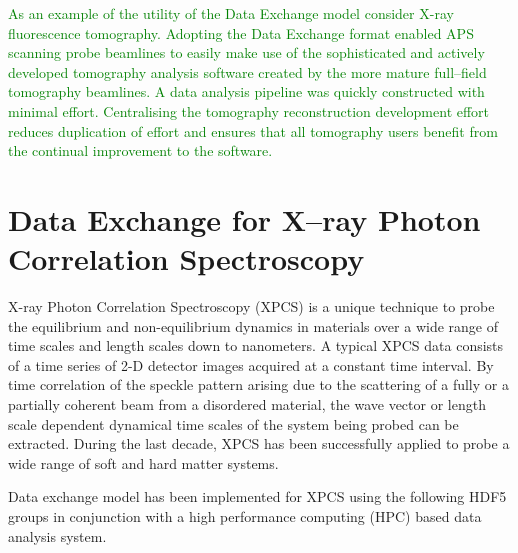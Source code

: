 \documentclass[pdf]{iucr}              %
\begin{document}
\textcolor{green}{As an example of the utility of the Data Exchange model consider X-ray fluorescence tomography. Adopting the Data Exchange format enabled APS scanning probe beamlines to easily make use of the sophisticated and actively developed tomography analysis software created by the more mature full--field tomography beamlines. A data analysis pipeline was quickly constructed with minimal effort. Centralising the tomography reconstruction development effort reduces duplication of effort and ensures that all tomography users benefit from the continual improvement to the software.}

\section{Data Exchange for X--ray Photon Correlation Spectroscopy}

X-ray Photon Correlation Spectroscopy (XPCS) is a unique technique to probe the equilibrium and non-equilibrium dynamics in materials over a wide range of time scales and length scales down to nanometers. A typical XPCS data consists of a time series of 2-D detector images acquired at a constant time interval. By time correlation of the speckle pattern arising due to the scattering of a fully or a partially coherent beam from a disordered material, the wave vector or length scale dependent dynamical time scales of the system being probed can be extracted. During the last decade, XPCS has been successfully applied to probe a wide range of soft and hard matter systems.

Data exchange model has been implemented for XPCS using the following HDF5 groups in conjunction with a high performance computing (HPC) based data analysis system.
\end{document}
